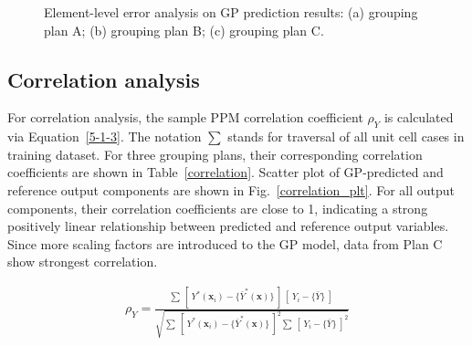 \documentclass[12pt]{extbook}
\begin{document}
\begin{figure}[htbp]
\centering
{}
\caption{Element-level error analysis on GP prediction results: (a) grouping plan A; (b) grouping plan B; (c) grouping plan C.}
\label{e_error}
\end{figure}

\subsection{Correlation analysis}

For correlation analysis, the sample PPM correlation coefficient $\rho_{Y}$ is calculated via Equation~\ref{5-1-3}. The notation $\sum$ stands for traversal of all unit cell cases in training dataset. For three grouping plans, their corresponding correlation coefficients are shown in Table~\ref{correlation}. Scatter plot of GP-predicted and reference output components are shown in Fig.~\ref{correlation_plt}. For all output components, their correlation coefficients are close to 1, indicating a strong positively linear relationship between predicted and reference output variables. Since more scaling factors are introduced to the GP model, data from Plan C show strongest correlation.

\begin{equation}
\begin{split}
\rho_{Y} = \frac{\sum~[~Y^*(\bm{x}_{i}) - \{\bar{Y}^*(\bm{x})\}~]~[~Y_i - \{\bar{Y}\}~]~}
{\sqrt{\sum{~[~Y^*(\bm{x}_{i}) - \{\bar{Y}^*(\bm{x})\}~]^2}\sum{~[~Y_i - \{\bar{Y}\}~]^2}}}
\end{split}
\label{5-1-3}
\end{equation}
\end{document}
